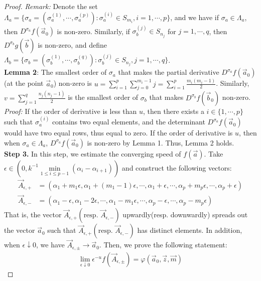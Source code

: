 \begin{proof}
\emph{Remark:} Denote the set $\Lambda_{a}=\{\sigma_{a}=(\sigma_{a}^{(1)},\cdots,\sigma_{a}^{(p)}):\sigma_{a}^{(i)}\in S_{m_{i}}, i=1,\cdots,p\}$, and we have if $\sigma_{a}\in \Lambda_{a}$, then $D^{\sigma_{a}}f(\vec{a}_{0})$ is non-zero. Similarly, if $\sigma^{(j)}_{b}\in S_{n_j}$ for $j=1,\cdots,q$, then $D^{\sigma_{b}}g(\vec{b})$ is non-zero, and define $\Lambda_{b}=\{\sigma_{b}=(\sigma_{b}^{(1)},\cdots,\sigma_{b}^{(q)}):\sigma_{b}^{(j)}\in S_{n_{j}}, j=1,\cdots,q\}$.\\
\textbf{Lemma 2}: The smallest order of $\sigma_{a}$ that makes the partial derivative $D^{\sigma_{a}}f(\vec{a}_{0})$(at the point $\vec{a}_{0}$) non-zero is $u=\sum_{i=1}^{p}\sum_{j=0}^{m_{i}-1}j=\sum_{i=1}^{p}\frac{m_{i}(m_{i}-1)}{2}$. Similarly, $v=\sum_{j=1}^{q}\frac{n_{j}(n_{j}-1)}{2}$ is the smallest order of $\sigma_{b}$ that makes $D^{\sigma_{b}}f(\vec{b}_{0})$ non-zero.\\
\emph{Proof:} If the order of derivative is less than $u$, then there exists a $i\in\{1,\cdots,p\}$ such that $\sigma_{a}^{(i)}$ contains two equal elements, and the determinant $D^{\sigma_{a}}f(\vec{a}_{0})$ would have two equal rows, thus equal to zero. If the order of derivative is $u$, then when $\sigma_{a}\in\Lambda_{a}$, $D^{\sigma_{a}}f(\vec{a}_{0})$ is non-zero by Lemma 1. Thus, Lemma 2 holds.\\
\textbf{Step 3. }In this step, we estimate the converging speed of $f(\vec{a})$. Take $\epsilon\in (0,k^{-1}\min\limits_{1\leqslant i\leqslant p-1}(\alpha_{i}-\alpha_{i+1}))$ and construct the following vectors:
\begin{align*}
	\vec{A}_{\epsilon,+}&=(\alpha_{1}+m_{1}\epsilon, \alpha_{1}+(m_{1}-1)\epsilon,\cdots,\alpha_{1}+\epsilon,\cdots,\alpha_{p}+m_{p}\epsilon,\cdots,\alpha_{p}+\epsilon)\\
	\vec{A}_{\epsilon,-}&=(\alpha_{1}-\epsilon, \alpha_{1}-2\epsilon,\cdots,\alpha_{1}-m_{1}\epsilon,\cdots,\alpha_{p}-\epsilon,\cdots,\alpha_{p}-m_{p}\epsilon)
\end{align*}
That is, the vector $\vec{A}_{\epsilon,+}(\text{resp. }\vec{A}_{\epsilon,-})$ upwardly(resp. downwardly) spreads out the vector $\vec{a}_{0}$ such that $\vec{A}_{\epsilon,+}(\text{resp. }\vec{A}_{\epsilon,-})$ has distinct elements. In addition, when $\epsilon\downarrow 0$, we have $\vec{A}_{\epsilon,\pm}\rightarrow\vec{a}_{0}$. Then, we prove the following statement:
\begin{align*}
	\lim_{\epsilon\downarrow 0}\epsilon^{-u}f(\vec{A}_{\epsilon,\pm})=\varphi(\vec{a}_{0},\vec{z},\vec{m})

\end{align*}
\end{proof}
